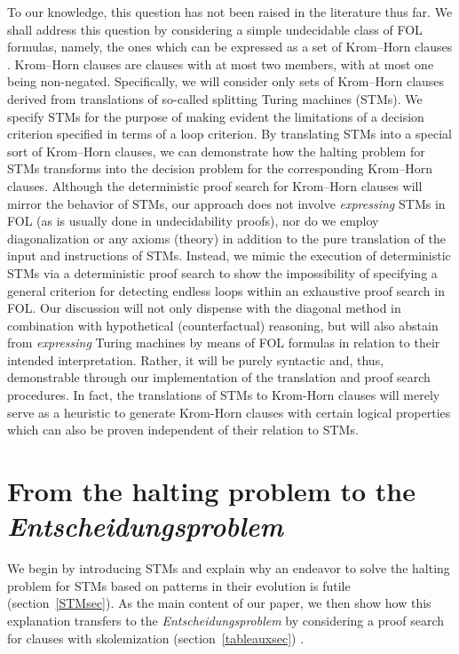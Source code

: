 \documentclass[%
  manuscript=article,   %
  year=2024,
  volume=77,
  doi=10.59203/zfn.77.694,
]{zfn}
\begin{document}
To our knowledge, this question has not been raised in the literature thus far. We shall address this question by considering a simple undecidable class of FOL formulas, namely, the ones which can be expressed as a set of Krom--Horn clauses%
. Krom--Horn clauses are clauses with at most two members, with at most one being non-negated. Specifically, we will consider only sets of Krom--Horn clauses derived from translations of so-called splitting Turing machines (STMs). We specify STMs for the purpose of making evident the limitations of a decision criterion specified in terms of a loop criterion. By translating STMs into a special sort of Krom--Horn clauses, we can demonstrate how the halting problem for STMs transforms into the decision problem for the corresponding Krom--Horn clauses. Although the deterministic proof search for Krom--Horn clauses %
will mirror the behavior of STMs, our approach does not involve \emph{expressing}
STMs in FOL (as is usually done in undecidability proofs), nor do we employ diagonalization or any axioms (theory) in addition to the pure translation of the input and instructions of STMs.
Instead, we mimic the execution of deterministic STMs via a deterministic proof search to show the impossibility of specifying a general criterion for detecting endless loops within an exhaustive proof search in FOL. Our discussion will not only dispense with the diagonal method in combination with hypothetical (counterfactual) reasoning, but will also abstain from \emph{expressing} Turing machines by means of FOL formulas in relation to their intended interpretation. Rather, it will be purely syntactic and, thus, demonstrable through our implementation of the translation and proof search procedures. In fact, the translations of STMs to Krom-Horn clauses will merely serve as a heuristic to generate Krom-Horn clauses with certain logical properties which can also be proven independent of their relation to STMs.


\section{From the halting problem to the \textit{Ent\-schei\-dungs\-problem}}\label{results}

We begin by introducing STMs and explain why an endeavor to solve the halting problem for STMs based on patterns in their evolution is futile (section~\ref{STMsec}). As the main content of our paper, we
then show how this explanation transfers to the \emph{Entscheidungsproblem} by considering a proof search for clauses with skolemization (section~\ref{tableauxsec})%
.
\end{document}
